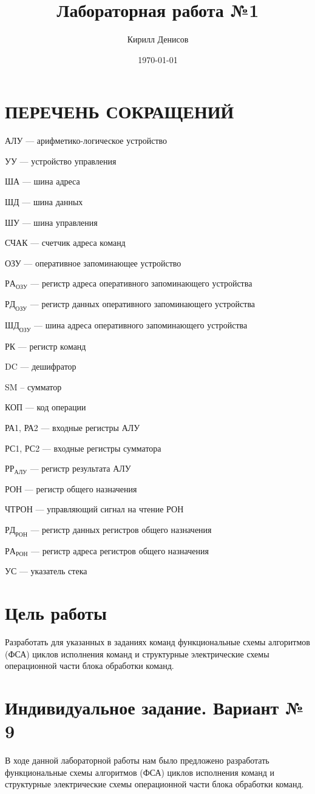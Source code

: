\documentclass[a4paper,14pt]{extarticle}
\author{Кирилл Денисов}
\title{Лабораторная работа №1}
\date{\today}
\newcommand{\pathToCommonFolder}{/home/denilai/Documents/repos/latex/Common}
\def\myformat#1{\hfil #1\hfil}
\begin{document}
	\thispagestyle{empty}
	
	\newpage
	\newpage



\section*{\myformat{ПЕРЕЧЕНЬ СОКРАЩЕНИЙ}}
АЛУ --- арифметико-логическое устройство

УУ --- устройство управления

ША --- шина адреса

ШД --- шина данных

ШУ --- шина управления

СЧАК --- счетчик адреса команд

ОЗУ  --- оперативное запоминающее устройство

$РА_{ОЗУ}$ --- регистр адреса оперативного запоминающего устройства

$РД_{ОЗУ}$ --- регистр данных оперативного запоминающего устройства

$ШД_{ОЗУ}$ --- шина адреса оперативного запоминающего устройства

РК  --- регистр команд


DC  --- дешифратор

SM -- сумматор

КОП --- код операции

РА1, РА2 --- входные регистры АЛУ

РС1, РС2 --- входные регистры сумматора

$РР_{АЛУ}$ --- регистр результата АЛУ

РОН --- регистр общего назначения

ЧТРОН --- управляющий сигнал на чтение РОН

$РД_{РОН}$  --- регистр данных регистров общего назначения

$РА_{РОН}$  --- регистр адреса регистров общего назначения

УС --- указатель стека

\newpage
	
	\section*{Цель работы}
	Разработать для указанных в заданиях команд функциональные схемы алгоритмов (ФСА) циклов исполнения команд и структурные электрические схемы операционной части блока обработки команд.
	\section*{Индивидуальное задание. Вариант № 9}
	В ходе данной лабораторной работы нам было предложено разработать функциональные схемы алгоритмов (ФСА) циклов исполнения команд и структурные электрические схемы операционной части блока обработки команд.
	
\end{document}
